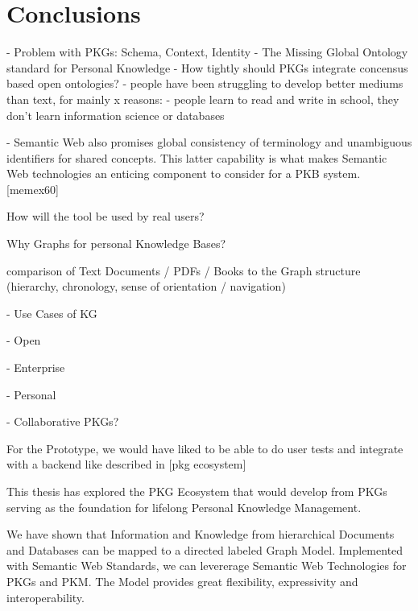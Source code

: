 \chapter{Conclusions} \label{ch:conclusions}


- Problem with PKGs: Schema, Context, Identity
- The Missing Global Ontology standard for Personal Knowledge
    - How tightly should PKGs integrate concensus based open ontologies?
- people have been struggling to develop better mediums than text, for mainly x reasons:
    - people learn to read and write in school, they don’t learn information science or databases

- Semantic Web also promises global consistency of terminology and unambiguous identifiers for shared concepts. This latter capability is what makes Semantic Web technologies an enticing component to consider for a PKB system. [memex60]

How will the tool be used by real users?

Why Graphs for personal Knowledge Bases?

comparison of Text Documents / PDFs / Books to the Graph structure (hierarchy, chronology, sense of orientation / navigation)

- Use Cases of KG
    
    - Open
    
    - Enterprise
    
    - Personal
    
    - Collaborative PKGs?


For the Prototype, we would have liked to be able to do user tests and integrate with a backend like described in [pkg ecosystem]


This thesis has explored the PKG Ecosystem that would develop from PKGs serving as the foundation for lifelong Personal Knowledge Management.

We have shown that Information and Knowledge from hierarchical Documents and Databases can be mapped to a directed labeled Graph Model. Implemented with Semantic Web Standards, we can levererage Semantic Web Technologies for PKGs and PKM. The Model provides great flexibility, expressivity and interoperability.

